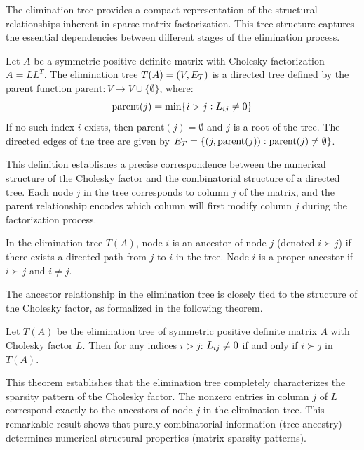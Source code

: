 The elimination tree provides a compact representation of the structural relationships inherent in sparse matrix factorization. This tree structure captures the essential dependencies between different stages of the elimination process.

\begin{definition}
Let $A$ be a symmetric positive definite matrix with Cholesky factorization $A = LL^T$. The elimination tree $T(A) = (V, E\sb{T})$ is a directed tree defined by the parent function $\text{parent}: V \to V \cup \{\emptyset\}$, where:
\begin{equation}
    \text{parent}(j) = \min\{i > j : L\sb{ij} \neq 0\}
\end{equation}
If no such index $i$ exists, then $\text{parent}(j) = \emptyset$ and $j$ is a root of the tree. The directed edges of the tree are given by $E\sb{T} = \{(j, \text{parent}(j)) : \text{parent}(j) \neq \emptyset\}$.
\end{definition}

This definition establishes a precise correspondence between the numerical structure of the Cholesky factor and the combinatorial structure of a directed tree. Each node $j$ in the tree corresponds to column $j$ of the matrix, and the parent relationship encodes which column will first modify column $j$ during the factorization process.

\begin{definition}
In the elimination tree $T(A)$, node $i$ is an ancestor of node $j$ (denoted $i \succ j$) if there exists a directed path from $j$ to $i$ in the tree. Node $i$ is a proper ancestor if $i \succ j$ and $i \neq j$.
\end{definition}

The ancestor relationship in the elimination tree is closely tied to the structure of the Cholesky factor, as formalized in the following theorem.

\begin{theorem}
Let $T(A)$ be the elimination tree of symmetric positive definite matrix $A$ with Cholesky factor $L$. Then for any indices $i > j$: $L\sb{ij} \neq 0$ if and only if $i \succ j$ in $T(A)$.
\end{theorem}

This theorem establishes that the elimination tree completely characterizes the sparsity pattern of the Cholesky factor. The nonzero entries in column $j$ of $L$ correspond exactly to the ancestors of node $j$ in the elimination tree. This remarkable result shows that purely combinatorial information (tree ancestry) determines numerical structural properties (matrix sparsity patterns).


